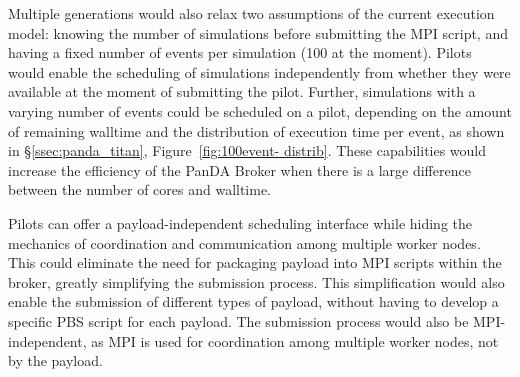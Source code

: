 
 Multiple
generations would also relax two assumptions of the current execution model:
knowing the number of simulations before submitting the MPI script, and having
a fixed number of events per simulation (100 at the moment). Pilots would
enable the scheduling of simulations independently from whether they were
available at the moment of submitting the pilot. Further, simulations with a
varying number of events could be scheduled on a pilot, depending on the
amount of remaining walltime and the distribution of execution time per event,
as shown in \S\ref{ssec:panda_titan}, Figure~\ref{fig:100event- distrib}.
These capabilities would increase the efficiency of the PanDA Broker when
there is a large difference between the number of cores and walltime.



Pilots can offer a payload-independent scheduling interface while hiding the
mechanics of coordination and communication among multiple worker nodes. This
could eliminate the need for packaging payload into MPI scripts within the
broker, greatly simplifying the submission process. This simplification would
also enable the submission of different types of payload, without having to
develop a specific PBS script for each payload. The submission process would
also be MPI-independent, as MPI is used for coordination among multiple worker
nodes, not by the payload. 
 

